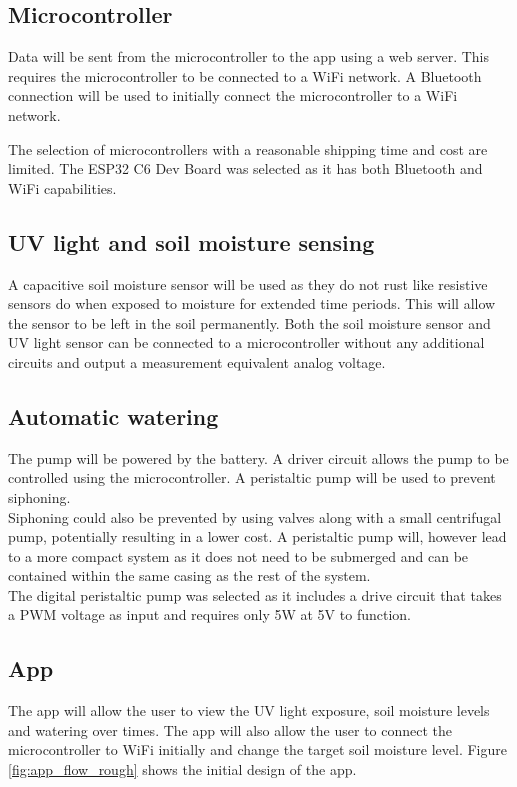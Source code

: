 \subsection{Microcontroller}
Data will be sent from the microcontroller to the app using a web server. This requires the microcontroller to be connected to a WiFi network. A Bluetooth connection will be used to initially connect the microcontroller to a WiFi network.

The selection of microcontrollers with a reasonable shipping time and cost are limited. The ESP32 C6 Dev Board was selected as it has both Bluetooth and WiFi capabilities.


\subsection{\Ac{UV} light and soil moisture sensing}
A capacitive soil moisture sensor will be used as they do not rust like resistive sensors do when exposed to moisture for extended time periods. This will allow the sensor to be left in the soil permanently. Both the soil moisture sensor and \ac{UV} light sensor can be connected to a microcontroller without any additional circuits and output a measurement equivalent analog voltage. 

\subsection{Automatic watering}
The pump will be powered by the battery. A driver circuit allows the pump to be controlled using the microcontroller. A peristaltic pump will be used to prevent siphoning. \\

Siphoning could also be prevented by using valves along with a small centrifugal pump, potentially resulting in a lower cost. A peristaltic pump will, however lead to a more compact system as it does not need to be submerged and can be contained within the same casing as the rest of the system. \\

The digital peristaltic pump was selected as it includes a drive circuit that takes a \ac{PWM} voltage as input and requires only 5W at 5V to function.

\subsection{App}
The app will allow the user to view the \ac{UV} light exposure, soil moisture levels and watering over times. The app will also allow the user to connect the microcontroller to WiFi initially and change the target soil moisture level. Figure \ref{fig:app_flow_rough} shows the initial design of the app. 

